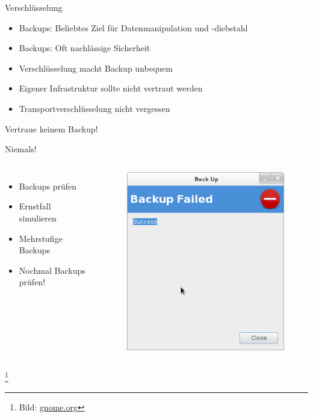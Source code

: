 \documentclass[10pt]{beamer}
\newcommand\blfootnote[1]{%
	\begingroup
	\renewcommand\thefootnote{}\footnote{#1}%
	\addtocounter{footnote}{-1}%
	\endgroup
}
\begin{document}
%
%
\begin{frame}[fragile]{Verschlüsselung}
	\begin{itemize}
	\item Backups: Beliebtes Ziel für Datenmanipulation und -diebstahl
	\item Backups: Oft nachlässige Sicherheit
	\item Verschlüsselung macht Backup unbequem
	\item Eigener Infrastruktur sollte nicht vertraut werden
	\item Transportverschlüsselung nicht vergessen
\end{itemize}
\end{frame}

%
%
\begin{frame}[fragile]{Vertraue keinem Backup!}
\begin{alertblock}{Niemals!}
\end{alertblock}
\begin{columns}[T,c,onlytextwidth]
	\begin{itemize}
		\item Backups prüfen
		\item Ernstfall simulieren
		\item Mehrstufige Backups
		\item Nochmal Backups prüfen!
	\end{itemize}
	\begin{figure}
		\includegraphics[width=1\textwidth]{images/failed-backup}
	\end{figure}
\end{columns}

\blfootnote{Bild: \href{https://mail.gnome.org/archives/deja-dup-list/2012-November/msg00000.html}{gnome.org}}
\end{frame}
\end{document}
